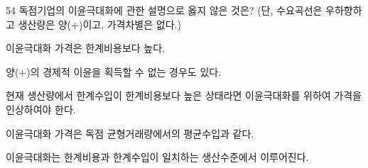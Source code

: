 \begin{question}{54}
독점기업의 이윤극대화에 관한 설명으로 옳지 않은 것은? (단, 수요곡선은 우하향하고 생산량은 양(+)이고, 가격차별은 없다.)
\begin{choices}
  \item 이윤극대화 가격은 한계비용보다 높다.
  \item 양(+)의 경제적 이윤을 획득할 수 없는 경우도 있다.
  \item 현재 생산량에서 한계수입이 한계비용보다 높은 상태라면 이윤극대화를 위하여 가격을 인상하여야 한다.
  \item 이윤극대화 가격은 독점 균형거래량에서의 평균수입과 같다.
  \item 이윤극대화는 한계비용과 한계수입이 일치하는 생산수준에서 이루어진다.
\end{choices}
\end{question}
